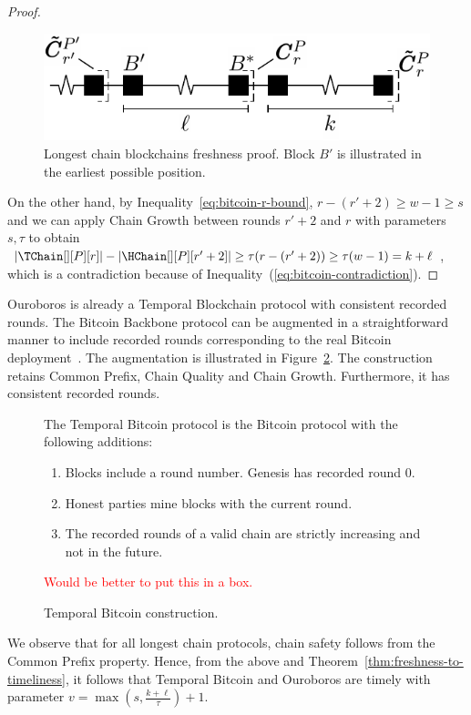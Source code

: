 \begin{proof}
  \begin{figure}
    \centering
    \includegraphics[width=0.5\columnwidth,keepaspectratio]{figures/longest-chain-proof.pdf}
    \caption{Longest chain blockchains freshness proof. Block $B'$ is illustrated in the
             earliest possible position.
    }
   \label{fig:longest-chain-freshness-proof}
  \end{figure}

  On the other hand, by Inequality~\ref{eq:bitcoin-r-bound}, $r - (r' + 2) \geq w - 1 \geq s$ and
  we can apply Chain Growth between rounds $r' + 2$ and $r$
  with parameters $s, \tau$ to obtain
  $|\TChain[][P][r]| - |\HChain[][P][r' + 2]| \geq \tau(r - (r' + 2)) \geq \tau (w - 1) =  k + \ell$,
  which is a contradiction because of Inequality~(\ref{eq:bitcoin-contradiction}).
  \Qed
\end{proof}

Ouroboros is already a Temporal Blockchain protocol with consistent recorded rounds.
The Bitcoin Backbone protocol can be augmented in a
straightforward manner to include recorded rounds
corresponding to the real Bitcoin deployment~\cite{mastering-bitcoin}.
The augmentation is illustrated in Figure~\ref{fig.temporal-backbone}.
The construction retains Common Prefix, Chain Quality and Chain Growth.
Furthermore, it has consistent recorded rounds.

\begin{figure}
  The Temporal Bitcoin protocol is the Bitcoin protocol with
  the following additions:

  \begin{enumerate}
    \item Blocks include a round number. Genesis has recorded round $0$.
    \item Honest parties mine blocks with the current round.
    \item The recorded rounds of a valid chain are strictly increasing and not in the future.
  \end{enumerate}
  \textcolor{red}{Would be better to put this in a box.}
  \caption{Temporal Bitcoin construction.}
  \label{fig.temporal-backbone}
\end{figure}

We observe that for all longest chain protocols, chain safety follows from the
Common Prefix property. Hence, from the above and Theorem~\ref{thm:freshness-to-timeliness},
it follows that Temporal Bitcoin and
Ouroboros are timely with parameter $v = \max(s, \frac{k + \ell}{\tau}) + 1$.
